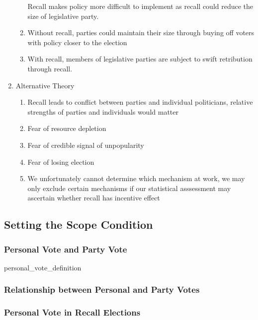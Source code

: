 \documentclass[hyphens, crop=false]{standalone}
\begin{document}
\begin{enumerate}
\begin{enumerate}
			Recall makes policy more difficult to implement
			as recall could reduce the size of legislative party.
			\item 
			Without recall, parties could maintain their size through buying off voters with policy closer to the election
			\item 
			With recall, members of legislative parties are subject to swift retribution through recall.
		\end{enumerate}
		\item 
		Alternative Theory
		\begin{enumerate}
			\item 
			Recall leads to conflict between parties and individual politicians, relative strengths of parties and individuals would matter
			\item 
			Fear of resource depletion
			\item 
			Fear of credible signal of unpopularity
			\item 
			Fear of losing election
			\item 
			We unfortunately cannot determine which mechanism at work, we may only exclude certain mechanisms if our statistical asssessment may ascertain whether recall has incentive effect
		\end{enumerate}
	\end{enumerate}
	\newpage
	
	\subsection*{Setting the Scope Condition}
		
		\subsubsection*{Personal Vote and Party Vote}
			{personal_vote_definition}
		
		\subsubsection*{Relationship between Personal and Party Votes}
		
		\subsubsection*{Personal Vote in Recall Elections}
			
		
\end{document}

